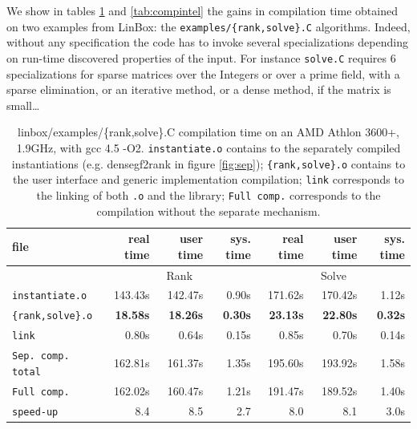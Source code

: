 \documentclass{article}
\newcommand{\linbox}{{\sc LinBox}\xspace}
\begin{document}
We show in tables \ref{tab:compilation} and \ref{tab:compintel} the
gains in compilation time
obtained on two examples from \linbox: the \texttt{examples/\{rank,solve\}.C} algorithms. 
 Indeed, without any specification
 the code has to invoke several specializations depending on
 run-time discovered properties of the input. For instance
 \texttt{solve.C} requires 6 specializations for sparse
 matrices over the Integers or over a prime field, with a sparse
 elimination, or an iterative method, or a dense method, if the matrix
 is small\ldots
\begin{table}[ht]\center
\begin{tabular}{|l||r|r|r||r|r|r|}
\hline
file                      &  real time   &  user time   &  sys. time  &  real time   &  user time   &  sys. time \\
\hline
 & \multicolumn{3}{|c||}{Rank}& \multicolumn{3}{|c|}{Solve}\\
\hline
\texttt{instantiate.o} & 143.43s & 142.47s & 0.90s & 171.62s & 170.42s & 1.12s\\
\texttt{\{rank,solve\}.o} & \bf 18.58s & \bf 18.26s & \bf 0.30s & \bf 23.13s & \bf 22.80s & \bf 0.32s\\
\texttt{link} & 0.80s & 0.64s & 0.15s & 0.85s & 0.70s & 0.14s\\
\hline
\texttt{Sep. comp. total} & 162.81s & 161.37s & 1.35s & 195.60s & 193.92s & 1.58s\\
\hline
\texttt{Full comp.} & 162.02s & 160.47s & 1.21s & 191.47s & 189.52s & 1.40s\\
\hline
\hline
\texttt{speed-up} & 8.4 & 8.5 & 2.7 & 8.0 & 8.1 & 3.0s\\
\hline
\end{tabular} 
\caption{linbox/examples/\{rank,solve\}.C compilation time on an AMD
  Athlon 3600+, 1.9GHz, with gcc 4.5 -O2. \texttt{instantiate.o} contains to the separately compiled
  instantiations (e.g. densegf2rank in figure \ref{fig:sep});
  \texttt{\{rank,solve\}.o} contains to the user interface and generic
  implementation compilation; \texttt{link} corresponds to the linking
  of both \texttt{.o} and the library; \texttt{Full comp.} corresponds
  to the compilation without the separate
  mechanism.}\label{tab:compilation}
\end{table}
\end{document}
